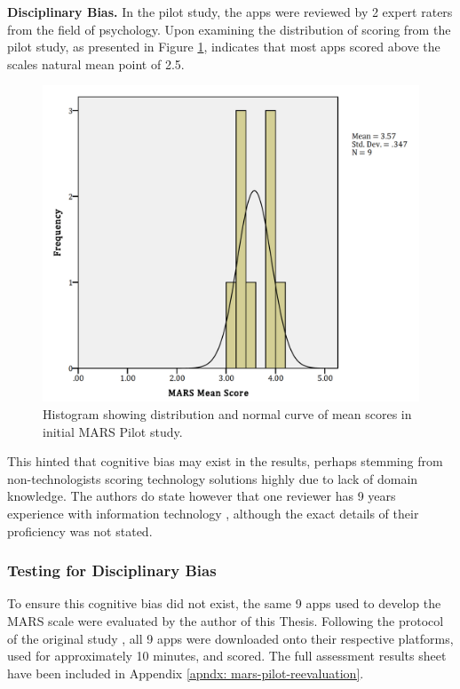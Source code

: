 \textbf{Disciplinary Bias.}
In the pilot study, the apps were reviewed by 2 expert raters from the field of psychology. Upon examining the distribution of scoring from the pilot study, as presented in Figure \ref{fig: mars-pilot-histogram}, indicates that most apps scored above the scales natural mean point of 2.5. \begin{figure}[t]
    \centering
    \includegraphics[scale=0.20, angle=0]{Files/prevention-study-2/figures/mars-pilot-histogram}
    \caption{Histogram showing distribution and normal curve of mean scores in initial MARS Pilot study.}
    \label{fig: mars-pilot-histogram}
\end{figure}
This hinted that cognitive bias may exist in the results, perhaps stemming from non-technologists scoring technology solutions highly due to lack of domain knowledge. The authors do state however that one reviewer has 9 years experience with information technology \cite{Stoyanov2015}, although the exact details of their proficiency was not stated.

\subsubsection{Testing for Disciplinary Bias}
To ensure this cognitive bias did not exist, the same 9 apps used to develop the MARS scale were evaluated by the author of this Thesis. Following the protocol of the original study \cite{Stoyanov2015}, all 9 apps were downloaded onto their respective platforms, used for approximately 10 minutes, and scored. The full assessment results sheet have been included in Appendix \ref{apndx: mars-pilot-reevaluation}.

